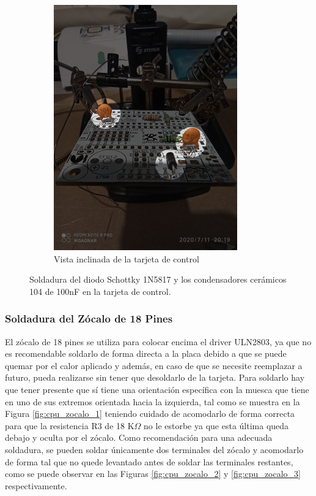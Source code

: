 \documentclass{article}
\begin{document}
\begin{figure}[H]
\begin{subfigure}[t]{0.3\textwidth}
        \includegraphics[width=0.9\columnwidth, height=1.2\columnwidth]{images/CPU/cpu_condensadores_2.png}
        \caption{Vista inclinada de la tarjeta de control}
        \label{fig:cpu_condensadores_2}
    \end{subfigure}
    \caption{Soldadura del diodo Schottky 1N5817 y los condensadores cerámicos 104 de 100nF en la tarjeta de control.}
    \label{fig:cpu_diodo_condensadores}
\end{figure}

\subsubsection{Soldadura del Zócalo de 18 Pines}
El zócalo de 18 pines se utiliza para colocar encima el driver ULN2803, ya que no es recomendable soldarlo de forma directa a la placa debido a que se puede quemar por el calor aplicado y además, en caso de que se necesite reemplazar a futuro, pueda realizarse sin tener que desoldarlo de la tarjeta. Para soldarlo hay que tener presente que sí tiene una orientación específica con la muesca que tiene en uno de sus extremos orientada hacia la izquierda, tal como se muestra en la Figura \ref{fig:cpu_zocalo_1} teniendo cuidado de acomodarlo de forma correcta para que la resistencia R3 de 18 K$\Omega$ no le estorbe ya que esta última queda debajo y oculta por el zócalo. Como recomendación para una adecuada soldadura, se pueden soldar únicamente dos terminales del zócalo y acomodarlo de forma tal que no quede levantado antes de soldar las terminales restantes, como se puede observar en las Figuras \ref{fig:cpu_zocalo_2} y  \ref{fig:cpu_zocalo_3} respectivamente.
\end{document}
